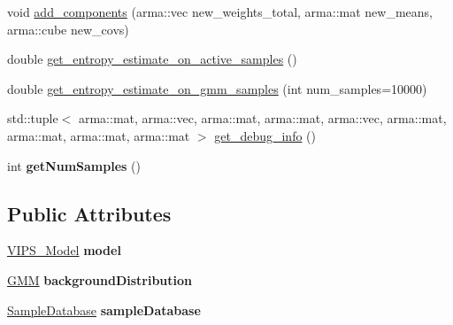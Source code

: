 \begin{DoxyCompactItemize}
void \hyperlink{classVIPS_aeb4149a37ec733f22ef9e302439c42da}{add\+\_\+components} (arma\+::vec new\+\_\+weights\+\_\+total, arma\+::mat new\+\_\+means, arma\+::cube new\+\_\+covs)
\item 
double \hyperlink{classVIPS_acfc4f6911881e21b1b06276f7514bcfa}{get\+\_\+entropy\+\_\+estimate\+\_\+on\+\_\+active\+\_\+samples} ()
\item 
double \hyperlink{classVIPS_aeec7ba6219e433ad9ab6214e4ed0dd4a}{get\+\_\+entropy\+\_\+estimate\+\_\+on\+\_\+gmm\+\_\+samples} (int num\+\_\+samples=10000)
\item 
std\+::tuple$<$ arma\+::mat, arma\+::vec, arma\+::mat, arma\+::mat, arma\+::vec, arma\+::mat, arma\+::mat, arma\+::mat, arma\+::mat $>$ \hyperlink{classVIPS_ac824a4180e5a8475eeb5a7c68a6483b6}{get\+\_\+debug\+\_\+info} ()
\item 
int {\bfseries get\+Num\+Samples} ()\hypertarget{classVIPS_a9c3c1617a3e8be6b02a7b5166711bb46}{}\label{classVIPS_a9c3c1617a3e8be6b02a7b5166711bb46}

\end{DoxyCompactItemize}
\subsection*{Public Attributes}
\begin{DoxyCompactItemize}
\item 
\hyperlink{classVIPS__Model}{V\+I\+P\+S\+\_\+\+Model} {\bfseries model}\hypertarget{classVIPS_a9929f2b77be4949c57ac9008d5f3ec5c}{}\label{classVIPS_a9929f2b77be4949c57ac9008d5f3ec5c}

\item 
\hyperlink{classGMM}{G\+MM} {\bfseries background\+Distribution}\hypertarget{classVIPS_a9e9d133d270287a47e693ebda4199a91}{}\label{classVIPS_a9e9d133d270287a47e693ebda4199a91}

\item 
\hyperlink{classSampleDatabase}{Sample\+Database} {\bfseries sample\+Database}\hypertarget{classVIPS_a29ce35cb0e4ba5bbff626bcccd88417b}{}\label{classVIPS_a29ce35cb0e4ba5bbff626bcccd88417b}

\end{DoxyCompactItemize}
